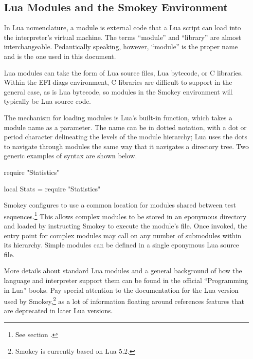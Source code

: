 \subsection{Lua Modules and the Smokey Environment}
\label{sec:ModulesAndSmokey}

In Lua nomenclature, a module is external code that a Lua script can load into
the interpreter's virtual machine.  The terms ``module'' and ``library'' are
almost interchangeable.  Pedantically speaking, however, ``module'' is the
proper name and is the one used in this document.

Lua modules can take the form of Lua source files, Lua bytecode, or C
libraries.  Within the EFI diags environment, C libraries are difficult to
support in the general case, as is Lua bytecode, so modules in the Smokey
environment will typically be Lua source code.

The mechanism for loading modules is Lua's built-in  function,
which takes a module name as a parameter.  The name can be in dotted notation,
with a dot or period character delineating the levels of the module hierarchy;
Lua uses the dots to navigate through modules the same way that it navigates a
directory tree.  Two generic examples of  syntax are shown
below.

\begin{LuaCode}[linewidth=4.5in]
require "Statistics"
\end{LuaCode}

\begin{LuaCode}[linewidth=4.5in]
local Stats = require "Statistics"
\end{LuaCode}

Smokey configures  to use a common location for modules shared
between test sequences.\footnote{See section .}
This allows complex modules to be stored in an eponymous directory and loaded
by instructing Smokey to execute the module's  file.  Once
invoked, the entry point for complex modules may call  on any
number of submodules within its hierarchy.  Simple modules can be defined in a
single eponymous Lua source file.

More details about standard Lua modules and a general background of how the
language and interpreter support them can be found in the official
``Programming in Lua'' books.  Pay special attention to the documentation for
the Lua version used by Smokey,\footnote{Smokey is currently based on Lua 5.2.}
as a lot of information floating around references features that are deprecated
in later Lua versions.

